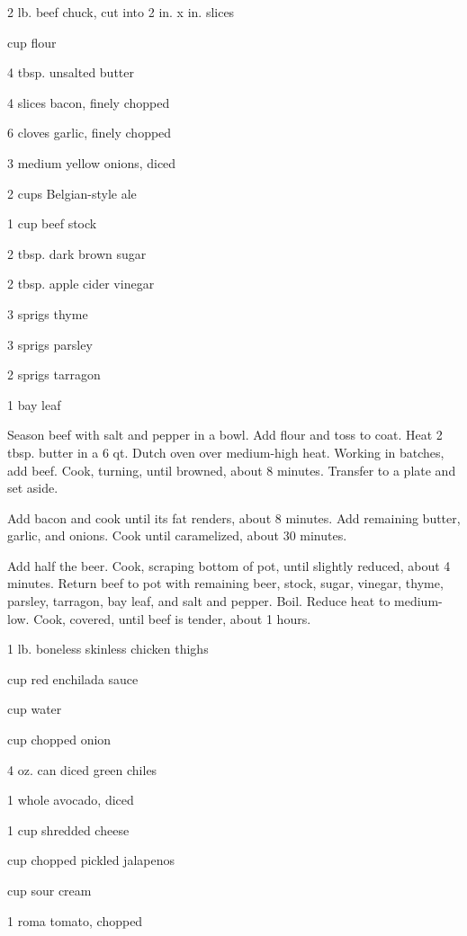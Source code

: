 \documentclass{cookbook}
\begin{document}

\begin{ingredients}
    \item 2 lb. beef chuck, cut into 2 in. x  in. slices
    \item {} cup flour
    \item 4 tbsp. unsalted butter
    \item 4 slices bacon, finely chopped
    \item 6 cloves garlic, finely chopped
    \item 3 medium yellow onions, diced
    \item 2 cups Belgian-style ale
    \item 1 cup beef stock
    \item 2 tbsp. dark brown sugar
    \item 2 tbsp. apple cider vinegar
    \item 3 sprigs thyme
    \item 3 sprigs parsley
    \item 2 sprigs tarragon
    \item 1 bay leaf
\end{ingredients}

Season beef with salt and pepper in a bowl. Add flour and toss to coat. Heat 2 tbsp. butter in a 6 qt. Dutch oven over medium-high heat. Working in batches, add beef. Cook, turning, until browned, about 8 minutes. Transfer to a plate and set aside.

Add bacon and cook until its fat renders, about 8 minutes. Add remaining butter, garlic, and onions. Cook until caramelized, about 30 minutes.

Add half the beer. Cook, scraping bottom of pot, until slightly reduced, about 4 minutes. Return beef to pot with remaining beer, stock, sugar, vinegar, thyme, parsley, tarragon, bay leaf, and salt and pepper. Boil. Reduce heat to medium-low. Cook, covered, until beef is tender, about 1  hours.


\begin{ingredients}
    \item 1 lb. boneless skinless chicken thighs
    \item {} cup red enchilada sauce
    \item {} cup water
    \item {} cup chopped onion
    \item 4 oz. can diced green chiles
    \item 1 whole avocado, diced
    \item 1 cup shredded cheese
    \item {} cup chopped pickled jalapenos
    \item {} cup sour cream
    \item 1 roma tomato, chopped
\end{ingredients}
\end{document}
